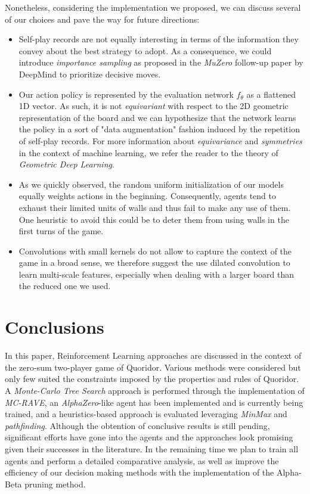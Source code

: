\documentclass[journal, a4paper]{IEEEtran}
\begin{document}
Nonetheless, considering the implementation we proposed, we can discuss several of our choices and pave the way for future directions:
\begin{itemize}
    \item Self-play records are not equally interesting in terms of the information they convey about the best strategy to adopt. As a consequence, we could introduce \textit{importance sampling} as proposed in the \textit{MuZero}\cite{muzero} follow-up paper by DeepMind to prioritize decisive moves.
    \item Our action policy is represented by the evaluation network $f_\theta$ as a flattened 1D vector. As such, it is not \textit{equivariant} with respect to the 2D geometric representation of the board and we can hypothesize that the network learns the policy in a sort of "data augmentation" fashion induced by the repetition of self-play records. For more information about \textit{equivariance} and \textit{symmetries} in the context of machine learning, we refer the reader to the theory of \textit{Geometric Deep Learning}\cite{gdl}.
    \item As we quickly observed, the random uniform initialization of our models equally weights actions in the beginning. Consequently, agents tend to exhaust their limited units of walls and thus fail to make any use of them. One heuristic to avoid this could be to deter them from using walls in the first turns of the game.
    \item Convolutions with small kernels do not allow to capture the context of the game in a broad sense, we therefore suggest the use dilated convolution\cite{dilated-conv} to learn multi-scale features, especially when dealing with a larger board than the reduced one we used.
\end{itemize}

\section{Conclusions}
\label{sec:conclusion}
In this paper, Reinforcement Learning approaches are discussed in the context of the zero-sum two-player game of Quoridor. Various methods were considered but only few suited the constraints imposed by the properties and rules of Quoridor. A \textit{Monte-Carlo Tree Search} approach is performed through the implementation of \textit{MC-RAVE}, an \textit{AlphaZero}-like agent has been implemented and is currently being trained, and a heuristics-based approach is evaluated leveraging \textit{MinMax} and \textit{pathfinding}. Although the obtention of conclusive results is still pending, significant efforts have gone into the agents and the approaches look promising given their successes in the literature. In the remaining time we plan to train all agents and perform a detailed comparative analysis, as well as improve the efficiency of our decision making methods with the implementation of the Alpha-Beta pruning method.
\end{document}
